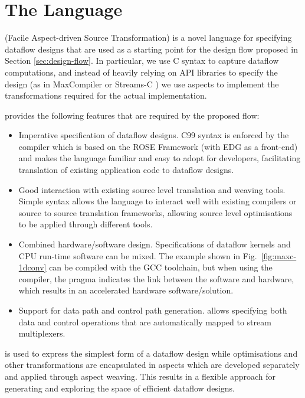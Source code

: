 \section{The \MAXC{} Language}
\label{sec:maxc}

\MAXC{} (Facile Aspect-driven Source Transformation) is a novel
language for specifying dataflow designs that are used as a starting
point for the design flow proposed in Section
\ref{sec:design-flow}. In particular, we use C syntax to capture
dataflow computations, and instead of heavily relying on API libraries
to specify the design (as in MaxCompiler \cite{5719584} or Streams-C
\cite{Gokhale:Stone:Arnold:Kalinowski:2000}) we use aspects to
implement the transformations required for the actual implementation.

\MAXC{} provides the following features that are
required by the proposed flow:

\begin{itemize}
\item Imperative specification of dataflow designs. C99 syntax is
  enforced by the \MAXC{} compiler which is based on the ROSE
  Framework (with EDG as a front-end) and makes the language familiar
  and easy to adopt for developers, facilitating translation of
  existing application code to dataflow designs.
\item Good interaction with existing source level translation and
  weaving tools. Simple syntax allows the language to interact well
  with existing compilers or source to source translation frameworks,
  allowing source level optimisations to be applied through different
  tools.
\item Combined hardware/software design. Specifications of dataflow
  kernels and CPU run-time software can be mixed. The example shown in
  Fig.~\ref{fig:maxc-1dconv} can be compiled with the GCC toolchain,
  but when using the \MAXC{} compiler, the pragma indicates the link
  between the software and hardware, which results in an accelerated
  hardware software/solution.
\item Support for data path and control path generation. \MAXC{}
  allows specifying both data and control operations that are
  automatically mapped to stream multiplexers.
\end{itemize}

\MAXC{} is used to express the simplest form of a dataflow design
while optimisations and other transformations are encapsulated in
aspects which are developed separately and applied through aspect
weaving. This results in a flexible approach for generating and
exploring the space of efficient dataflow designs.

